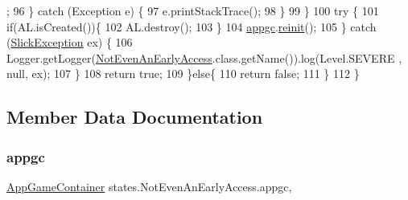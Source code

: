 \begin{DoxyCode}
      ;
96                 \} \textcolor{keywordflow}{catch} (Exception e) \{
97                     e.printStackTrace();
98                 \}
99             \}
100             \textcolor{keywordflow}{try} \{
101                 \textcolor{keywordflow}{if}(AL.isCreated())\{
102                     AL.destroy();
103                 \}
104                 \mbox{\hyperlink{classstates_1_1_not_even_an_early_access_a6dbb502cb4c878abfd65a496df8fdda7}{appgc}}.\mbox{\hyperlink{classorg_1_1newdawn_1_1slick_1_1_app_game_container_a1b0b230965ebebc9d4f43acf93986fd3}{reinit}}();
105             \} \textcolor{keywordflow}{catch} (\mbox{\hyperlink{classorg_1_1newdawn_1_1slick_1_1_slick_exception}{SlickException}} ex) \{
106                 Logger.getLogger(\mbox{\hyperlink{classstates_1_1_not_even_an_early_access_a841753f18ba88df25763818e6caa686f}{NotEvenAnEarlyAccess}}.class.getName()).log(Level.SEVERE
      , null, ex);
107             \}
108             \textcolor{keywordflow}{return} \textcolor{keyword}{true};
109         \}\textcolor{keywordflow}{else}\{
110             \textcolor{keywordflow}{return} \textcolor{keyword}{false};
111         \}
112     \}
\end{DoxyCode}


\subsection{Member Data Documentation}
\mbox{\label{classstates_1_1_not_even_an_early_access_a6dbb502cb4c878abfd65a496df8fdda7}} 
\subsubsection{\texorpdfstring{appgc}{appgc}}
{\footnotesize\ttfamily \mbox{\hyperlink{classorg_1_1newdawn_1_1slick_1_1_app_game_container}{App\+Game\+Container}} states.\+Not\+Even\+An\+Early\+Access.\+appgc\hspace{0.3cm}{\ttfamily [static]}, {\ttfamily [private]}}

\mbox{\label{classstates_1_1_not_even_an_early_access_a2cee2d7dfd6a182fd0ea5225cf46db9b}} 
